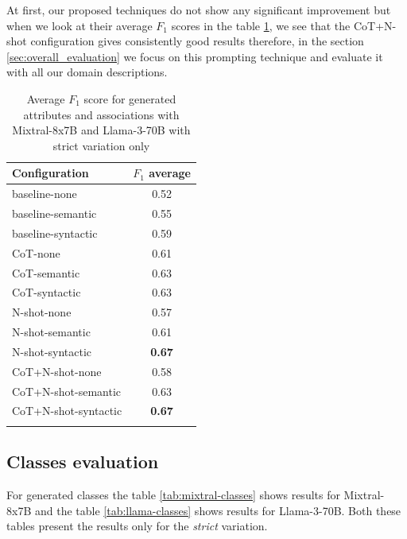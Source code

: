 At first, our proposed techniques do not show any significant improvement but when we look at their average $F_1$ scores in the table \ref{tab:F1_attributes_associations_average}, we see that the CoT+N-shot configuration gives consistently good results therefore, in the section \ref{sec:overall_evaluation} we focus on this prompting technique and evaluate it with all our domain descriptions.


\begin{table}[!h]
    \scriptsize
    \centering
    \setlength{\tabcolsep}{0.5em}
    \begin{tabular}{lc}
     \toprule
        Configuration & $F_1$ average \\
    \toprule
    
    \addlinespace
    baseline-none  & 0.52  \\
    baseline-semantic  & 0.55  \\
    baseline-syntactic  & 0.59  \\
    CoT-none	& 0.61  \\
    CoT-semantic & 0.63  \\
    CoT-syntactic & 0.63  \\
    N-shot-none & 0.57 \\
    N-shot-semantic & 0.61 \\
    N-shot-syntactic & \textbf{0.67} \\
    CoT+N-shot-none & 0.58 \\
    CoT+N-shot-semantic & 0.63 \\
    CoT+N-shot-syntactic & \textbf{0.67} \\
    \addlinespace
    \bottomrule
    \addlinespace
    \end{tabular}
    \caption{Average $F_1$ score for generated attributes and associations with Mixtral-8x7B and Llama-3-70B with strict variation only}
    \label{tab:F1_attributes_associations_average}
\end{table}


\subsection{Classes evaluation}

For generated classes the table \ref{tab:mixtral-classes} shows results for Mixtral-8x7B and the table \ref{tab:llama-classes} shows results for Llama-3-70B. Both these tables present the results only for the \emph{strict} variation.

